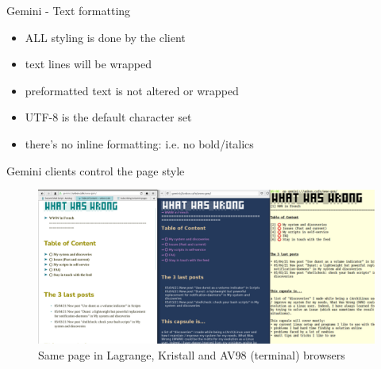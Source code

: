 \documentclass[presentation, 11pt,  aspectratio=169]{beamer}
\begin{document}
\begin{frame}[label={sec:org408f758}]{Gemini - Text formatting}
\begin{itemize}
\item \alert{ALL} styling is done by the client\\
\item text lines will be wrapped\\
\item preformatted text is not altered or wrapped\\
\item UTF-8 is the default character set\\
\item there's no inline formatting: i.e. no bold/italics\\
\end{itemize}
\end{frame}

\begin{frame}[label={sec:org56261c7}]{Gemini clients control the page style}
\begin{figure}[htbp]
\centering
\includegraphics[width=1\textwidth]{images/threebrowsers.png}
\caption{Same page in Lagrange, Kristall and AV98 (terminal) browsers}
\end{figure}
\end{frame}
\end{document}
